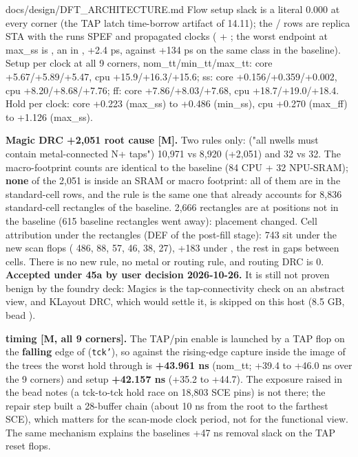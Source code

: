 \begin{relocated}{docs/design/DFT_ARCHITECTURE.md}
Flow setup slack is a literal 0.000 at every corner (the TAP latch
time-borrow artifact of 14.11); the / rows
are replica STA with the run\textquotesingle s SPEF and propagated
clocks ( +
; the worst 
endpoint at max\_ss is , an  in
, +2.4 ps, against +134 ps on the same class
in the baseline). Setup per clock at all 9 corners,
nom\_\allowbreak{}tt/\allowbreak{}min\_\allowbreak{}tt/\allowbreak{}max\_\allowbreak{}tt:
core +5.67/\allowbreak{}+5.89/\allowbreak{}+5.47, cpu
+15.9/\allowbreak{}+16.3/\allowbreak{}+15.6; ss: core
+0.156/\allowbreak{}+0.359/\allowbreak{}+0.002, cpu
+8.20/\allowbreak{}+8.68/\allowbreak{}+7.76; ff: core
+7.86/\allowbreak{}+8.03/\allowbreak{}+7.68, cpu
+18.7/\allowbreak{}+19.0/\allowbreak{}+18.4. Hold per clock: core +0.223
(max\_ss) to +0.486 (min\_ss), cpu +0.270 (max\_ff) to +1.126 (max\_ss).

\textbf{Magic DRC +2,051 root cause {[}M{]}.} Two rules only:
 ("all nwells must contain metal-connected N+ taps")
10,971 vs 8,920 (+2,051) and  32 vs 32. The
macro-footprint counts are identical to the baseline (84 CPU + 32
NPU-SRAM); \textbf{none} of the 2,051 is inside an SRAM or macro
footprint: all of them are in the standard-cell rows, and the rule is
the same one that already accounts for 8,836 standard-cell rectangles of
the baseline. 2,666 rectangles are at positions not in the baseline (615
baseline rectangles went away): placement changed. Cell attribution
under the rectangles (DEF of the post-fill stage): 743 sit under the new
scan flops ( 486,  88,  57,
 46,  38,  27), +183 under
, the rest in gaps between cells. There is no new
rule, no metal or routing rule, and routing DRC is 0. \textbf{Accepted
under 45a by user decision 2026-10-26.} It is still not proven benign by
the foundry deck: Magic\textquotesingle s  is the
tap-connectivity check on an abstract view, and KLayout DRC, which would
settle it, is skipped on this host (8.5 GB, bead ).

\textbf{ timing {[}M, all 9 corners{]}.} The TAP/pin
enable is launched by a TAP flop on the \textbf{falling} edge of
 (\texttt{tck'}), so against the rising-edge capture inside
the  image of the trees the worst hold through
 is \textbf{+43.961 ns} (nom\_tt; +39.4 to +46.0 ns
over the 9 corners) and setup \textbf{+42.157 ns} (+35.2 to +44.7). The
exposure raised in the bead notes (a tck-to-tck hold race on 18,803 SCE
pins) is not there; the repair step built a 28-buffer chain (about 10 ns
from the root to the farthest SCE), which matters for the scan-mode
clock period, not for the functional view. The same mechanism explains
the baseline\textquotesingle s +47 ns removal slack on the TAP reset
flops.


\end{relocated}
